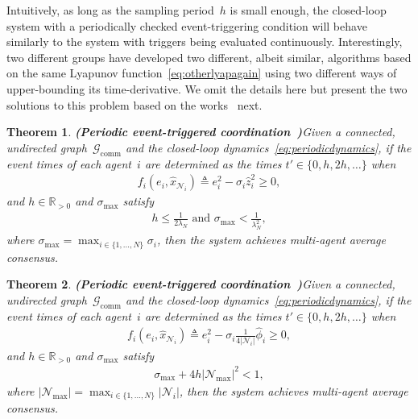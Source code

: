 \documentclass{autart}
\newtheorem{theorem}{Theorem}[section]
\newcommand{\realpositive}{\mathbb{R}_{>0}}
\newcommand{\GG}{{\mathcal{G}}}
\newcommand{\NN}{{\mathcal{N}}}
\newcommand{\until}[1]{\{1,\dots, #1\}}
\newcommand{\commgraph}{\GG_\text{comm}}
\renewcommand{\hat}{\widehat}
\newcommand{\longthmtitle}[1]{\mbox{}\textup{\textbf{(#1)}}}
\begin{document}
Intuitively, as long as the sampling period~$h$ is small enough, the
closed-loop system with a periodically checked event-triggering
condition will behave similarly to the system with triggers being
evaluated continuously. Interestingly, two different groups have
developed two different, albeit similar, algorithms based on the same
Lyapunov function~\eqref{eq:otherlyapagain} using two different ways
of upper-bounding its time-derivative.  We omit the details here but
present the two solutions to this problem based on the
works~\citep{XM-TC:13,CN-JC:16-auto} next.

\begin{theorem}\longthmtitle{Periodic event-triggered
    coordination~\citep{XM-TC:13}}\label{th:sampled-data1}  
  Given {a connected, undirected graph~$\commgraph$ and} the
  closed-loop dynamics~\eqref{eq:periodicdynamics}, if the event times
  of each agent~$i$ are determined as the times $t' \in \{0, h, 2h,
  \dots \}$ when
  \begin{align*}
    f_i(e_i, \hat{x}_{\NN_i}) \triangleq e_i^2 - \sigma_i
    \hat{z}_i^2\geq 0,
  \end{align*}
  and $h \in \realpositive$ and $\sigma_\text{max}$ satisfy
  \begin{align}\label{eq:bound}
    h \leq \frac{1}{2 \lambda_N} \text{ and } \sigma_\text{max} <
    \frac{1}{\lambda_N^2} ,
  \end{align}
  where $\sigma_\text{max} = \max_{i \in \until{N}} \sigma_i$, then the
  system achieves multi-agent average consensus.
\end{theorem}

\begin{theorem}\longthmtitle{Periodic event-triggered
    coordination~\citep{CN-JC:16-auto}}\label{th:sampled-data2} 
  Given {a connected, undirected graph~$\commgraph$ and} the
  closed-loop dynamics~\eqref{eq:periodicdynamics}, if the event times
  of each agent~$i$ are determined as the times $t' \in \{0, h, 2h,
  \dots \}$ when
  \begin{align}\label{eq:trigger4}
    f_i(e_i, \hat{x}_{ \NN_i}) \triangleq e_i^2 - \sigma_i
    \frac{1}{4 |\NN_i|} \hat{\phi}_i \geq 0,
  \end{align}
  and $h \in \realpositive$ and $\sigma_\text{max}$ satisfy
  \begin{align}\label{eq:bound2}
    \sigma_{\max} + 4 h |\NN_\text{max} |^2 < 1,
  \end{align}
  where $|\NN_\text{max} | = \max_{i \in \until{N}} |\NN_i |$,
  then the system achieves multi-agent average consensus.
\end{theorem}
\end{document}
